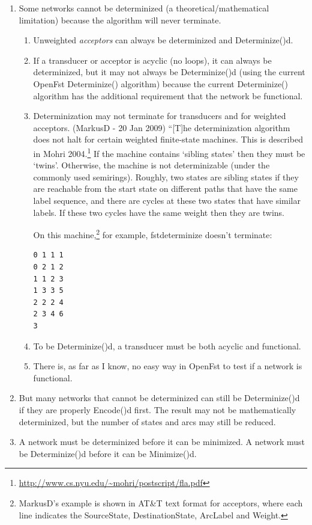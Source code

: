 \documentclass[letterpaper,12pt]{article}
\begin{document}
\begin{enumerate}
\item
Some networks cannot be determinized (a theoretical/mathematical limitation) because
the algorithm will never terminate. 

\begin{enumerate}
\item
Unweighted \emph{acceptors} can always be determinized and Determinize()d.

\item
If a transducer or acceptor is acyclic (no loops), it can always be determinized, but it may
not always be Determinize()d (using the current OpenFst Determinize() algorithm)
because
the current Determinize() algorithm has the additional requirement that the network be functional. 

\item
Determinization may not terminate for transducers and for weighted acceptors.
(MarkusD - 20 Jan 2009) ``[T]he determinization algorithm does  
not halt for certain weighted finite-state machines. This is described  
in Mohri 2004.\footnote{\url{http://www.cs.nyu.edu/~mohri/postscript/fla.pdf}} If  
the machine contains `sibling states' then they must be `twins'.  
Otherwise, the machine is not determinizable (under the commonly used  
semirings). Roughly, two states are sibling states if they are reachable from the  
start state on different paths that have the same label sequence, and  
there are cycles at these two states that have similar labels. If  
these two cycles have the same weight then they are twins.

On this machine,\footnote{MarkusD's example is shown in AT\&T text format for
acceptors, where each line indicates the SourceState, DestinationState, ArcLabel
and Weight.} for example, fstdeterminize doesn't terminate:

\begin{Verbatim}[fontsize=\small]
0 1 1 1
0 2 1 2
1 1 2 3
1 3 3 5
2 2 2 4
2 3 4 6
3
\end{Verbatim}

\item
To be Determinize()d, a transducer must be both acyclic and functional.

\item
There is, as far as I know, no easy way in OpenFst to test if a network is
functional.

\end{enumerate}


\item
But many networks that cannot be determinized
can still be Determinize()d if they are properly Encode()d first.  The result may
not be mathematically determinized, but the number of states and arcs may still be
reduced.

\item
A network must be determinized before it can be minimized.  A network must be
Determinize()d before it can be Minimize()d.

\end{enumerate}
\end{document}
